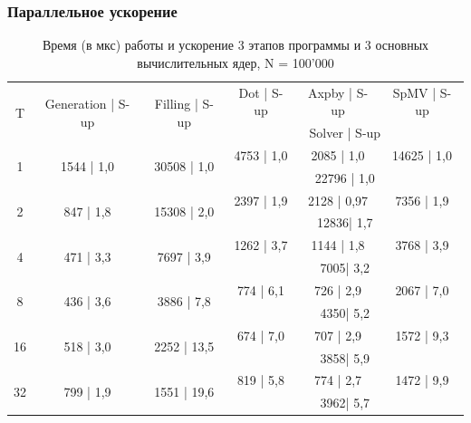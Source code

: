 		\subsubsection{Параллельное ускорение}
		\begin{table}[H]
			\centering
			\begin{tabular}{|c||c|c|c|c|c|}
				\hline
				\multirow{2}{*}{T} &  \multirow{2}{*}{Generation | S-up} & \multirow{2}{*}{Filling | S-up} & Dot | S-up & Axpby | S-up & SpMV | S-up \\ \cline{4-6}
				                   &                              &                         & \multicolumn{3}{c|}{Solver | S-up} \\ \hline
                \multirow{2}{*}{1} & \multirow{2}{*}{1544 | 1,0} & \multirow{2}{*}{30508 | 1,0} & 4753 | 1,0 & 2085 | 1,0 & 14625 | 1,0 \\ \cline{4-6}
                                   &                   &                   & \multicolumn{3}{c|}{22796 | 1,0}   \\ \hline
                \multirow{2}{*}{2} & \multirow{2}{*}{847 | 1,8} & \multirow{2}{*}{15308 | 2,0} & 2397 | 1,9 & 2128 | 0,97 & 7356 |  1,9\\ \cline{4-6}
                                   &                   &                   & \multicolumn{3}{c|}{12836| 1,7}   \\ \hline
                \multirow{2}{*}{4} & \multirow{2}{*}{471 | 3,3} & \multirow{2}{*}{7697 | 3,9} & 1262 | 3,7& 1144 | 1,8& 3768 | 3,9\\ \cline{4-6}
                                   &                   &                   & \multicolumn{3}{c|}{7005| 3,2}   \\ \hline
                \multirow{2}{*}{8} & \multirow{2}{*}{436 | 3,6} & \multirow{2}{*}{3886 | 7,8} & 774 | 6,1& 726 | 2,9& 2067 |  7,0\\ \cline{4-6}
                                   &                   &                   & \multicolumn{3}{c|}{4350| 5,2}   \\ \hline
                \multirow{2}{*}{16} & \multirow{2}{*}{518 | 3,0} & \multirow{2}{*}{2252 | 13,5} & 674 | 7,0& 707 | 2,9& 1572 |  9,3\\ \cline{4-6}
                                   &                   &                   & \multicolumn{3}{c|}{3858| 5,9}   \\ \hline
                \multirow{2}{*}{32} & \multirow{2}{*}{799 | 1,9} & \multirow{2}{*}{1551 | 19,6} & 819 | 5,8& 774 | 2,7& 1472 |  9,9\\ \cline{4-6}
                                   &                   &                   & \multicolumn{3}{c|}{3962| 5,7}   \\ \hline

			\end{tabular}
			\caption{Время (в мкс) работы и ускорение 3 этапов программы и 3 основных вычислительных ядер, N = 100'000}
			\label{par_1}
		\end{table}
